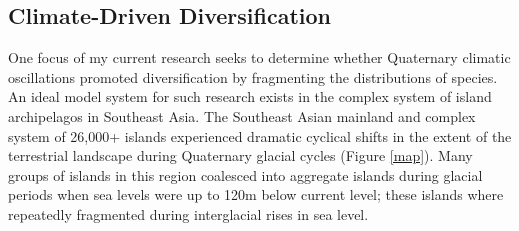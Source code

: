 \documentclass[10pt]{article}
\begin{document}

\subsection*{Climate-Driven Diversification}
One focus of my current research seeks to determine whether Quaternary climatic
oscillations promoted diversification by fragmenting the distributions of
species.
An ideal model system for such research exists in the complex system of island
archipelagos in Southeast Asia.
The Southeast Asian mainland and complex system of 26,000+ islands experienced
dramatic cyclical shifts in the extent of the terrestrial landscape during
Quaternary glacial cycles (Figure \ref{map}).
Many groups of islands in this region coalesced into aggregate islands during
glacial periods when sea levels were up to 120m below current level; these
islands where repeatedly fragmented during interglacial rises in sea level.
\end{document}

